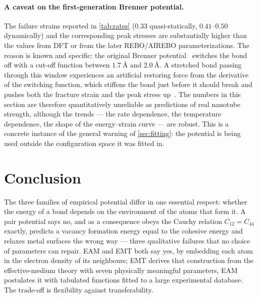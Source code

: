 \documentclass[11pt,a4paper]{article}
\numberwithin{equation}{section}
\theoremstyle{remark}
\begin{document}
\paragraph{A caveat on the first-generation Brenner potential.}
The failure strains reported in \cref{tab:rates} ($0.33$ quasi-statically, $0.41$--$0.50$ dynamically)
and the corresponding peak stresses are substantially higher than the values from DFT or from the
later REBO/AIREBO parameterizations. The reason is known and specific: the original Brenner
potential~\citep{brenner1990} switches the bond off with a cut-off function between $\SI{1.7}{\angstrom}$
and $\SI{2.0}{\angstrom}$. A stretched bond passing through this window experiences an artificial
restoring force from the derivative of the switching function, which stiffens the bond just before it
should break and pushes both the fracture strain and the peak stress up~\citep{shenderova2000}. The
numbers in this section are therefore quantitatively unreliable as predictions of real nanotube
strength, although the trends --- the rate dependence, the temperature dependence, the shape of the
energy--strain curve --- are robust. This is a concrete instance of the general warning of
\cref{sec:fitting}: the potential is being used outside the configuration space it was fitted in.

\section{Conclusion}\label{sec:conclusion}

The three families of empirical potential differ in one essential respect: whether the energy of a bond
depends on the environment of the atoms that form it. A pair potential says no, and as a consequence
obeys the Cauchy relation $C_{12} = C_{44}$ exactly, predicts a vacancy formation energy equal to the
cohesive energy and relaxes metal surfaces the wrong way --- three qualitative failures that no choice
of parameters can repair. EAM and EMT both say yes, by embedding each atom in the electron density of
its neighbours; EMT derives that construction from the effective-medium theory with seven physically
meaningful parameters, EAM postulates it with tabulated functions fitted to a large experimental
database. The trade-off is flexibility against transferability.
\end{document}
